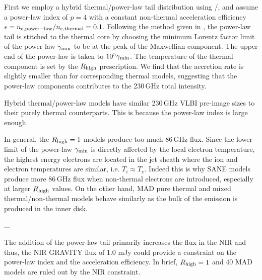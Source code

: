First we employ a hybrid thermal/power-law tail distribution using \hamr/\bhoss, and assume a power-law index of $p=4$ with a constant non-thermal acceleration efficiency $\epsilon=n_{\rm e, power-law}/n_{\rm e, thermal}=0.1$. Following the method given in \citet{Chatterjee2021}, the power-law tail is stitched to the thermal core by choosing the minimum Lorentz factor limit of the power-law $\gamma_{\rm min}$ to be at the peak of the Maxwellian component. The upper end of the power-law is taken to $10^5 \gamma_{\rm min}$.  The temperature of the thermal component is set by the $R_\mathrm{high}$ prescription.  We find that the accretion rate is slightly smaller than for corresponding thermal models, suggesting that the power-law components contributes to the 230\,GHz total intensity.


Hybrid thermal/power-law models have similar 230\,GHz VLBI pre-image sizes to their purely thermal counterparts. This is because the power-law index is large enough


In general, the $R_{\rm high}=1$ models produce too much 86\,GHz flux. Since the lower limit of the power-law $\gamma_{\rm min}$ is directly affected by the local electron temperature, the highest energy electrons are located in the jet sheath where the ion and electron temperatures are similar, i.e. $T_i\approx T_e$. Indeed this is why SANE models produce more 86\,GHz flux when non-thermal electrons are introduced, especially at larger $R_{\rm high}$ values. On the other hand, MAD pure thermal and mixed thermal/non-thermal models behave similarly as the bulk of the emission is produced in the inner disk.


...


The addition of the power-law tail primarily increases the flux in the NIR and thus, the NIR GRAVITY flux of 1.0 mJy could provide a constraint on the power-law index and the acceleration efficiency. In brief, $R_{\rm high}=1$ and $40$ MAD models are ruled out by the NIR constraint.

